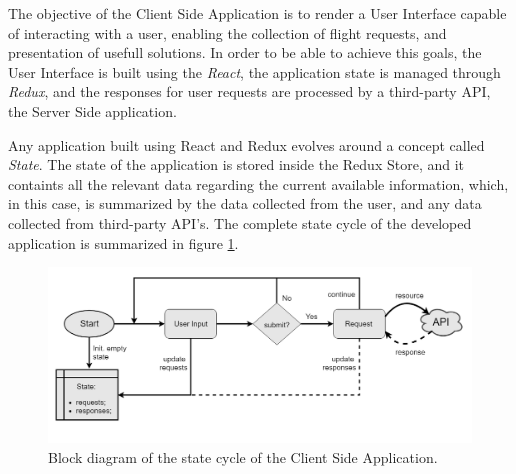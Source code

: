 

The objective of the Client Side Application is to render a User Interface capable of interacting with a user,
enabling the collection of flight requests, and presentation of usefull solutions.
In order to be able to achieve this goals, the User Interface is built using the \textit{React}, 
the application state is managed through \textit{Redux},
and the responses for user requests are processed by a third-party API, the Server Side application.

Any application built using React and Redux evolves around a concept called \textit{State}.
The state of the application is stored inside the Redux Store, 
and it containts all the relevant data regarding the current available information, which, 
in this case, is summarized by the data collected from the user, and any data collected from third-party API's.
The complete state cycle of the developed application is summarized in figure \ref{fig:app_state_cycle}.


\begin{figure}[htpb]
  \centering
  \includegraphics[width=\textwidth]{./Figures/system_implementation/state_flow.png}
  \caption{Block diagram of the state cycle of the Client Side Application.}
  \label{fig:app_state_cycle}  
\end{figure}


